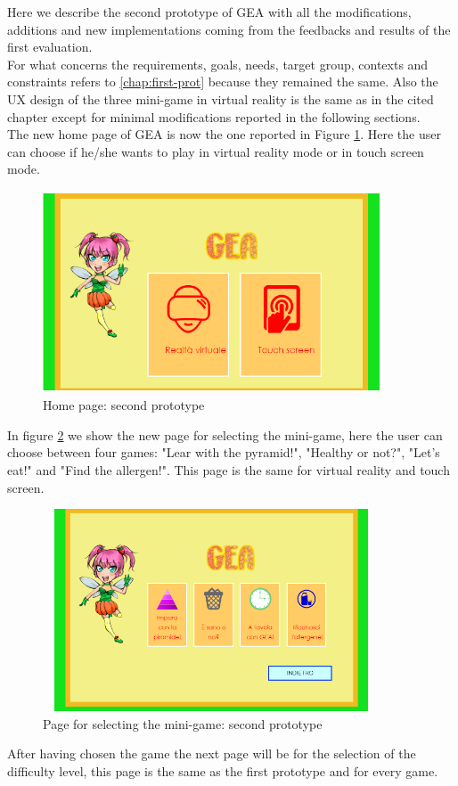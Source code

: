 Here we describe the second prototype of GEA with all the modifications, additions and new implementations coming from the feedbacks and results of the first evaluation.\\
For what concerns the requirements, goals, needs, target group, contexts and constraints refers to \autoref{chap:first-prot} because they remained the same. Also the UX design of the three mini-game in virtual reality is the same as in the cited chapter except for minimal modifications reported in the following sections.\\
The new home page of GEA is now the one reported in Figure \ref{fig:newhomepage}. Here the user can choose if he/she wants to play in virtual reality mode or in touch screen mode. \\
\begin{figure}[H]
\centering
\includegraphics[width=10cm, height=6cm]{immagini/homepagenew.png}
\caption{Home page: second prototype}\label{fig:newhomepage}
\end{figure}
In figure \ref{fig:newselection} we show the new page for selecting the mini-game, here the user can choose between four games: "Lear with the pyramid!", "Healthy or not?", "Let's eat!" and "Find the allergen!". This page is the same for virtual reality and touch screen.
\begin{figure}[H]
\centering
\includegraphics[width=10cm, height=6cm]{immagini/selectionnew.png}
\caption{Page for selecting the mini-game: second prototype}\label{fig:newselection}
\end{figure}
After having chosen the game the next page will be for the selection of the difficulty level, this page is the same as the first prototype and for every game.
